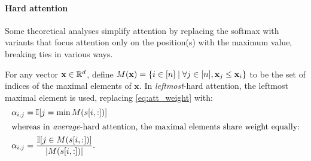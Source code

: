 \iffalse
Our definition deviates from the original formulation \citep{vaswani-etal-2017 attention} and commonly-used implementations in a few ways:
\begin{compactenum}
    \item Originally, $\qproj$ and $\kproj$ had $d_\text{k}$ output dimensions and $\vproj$ had $d_\text{v}$ output dimensions, and $d_\text{k}=d_\text{v}$. Here, we set all three to $\dhid$, aligning with common practice in implementations.
    \item Originally, $\outmap$ was defined as part of multi-head attention, but we have moved it into attention.
    This does not change the model.
    \item \Cref{eq:att_weight} is equivalent to the more usual matrix form $\softmax\mleft(\frac{\mat{Q}\mat{K}^\top}{\sqrt{\dhid}}\mright)\mat{V}$, where $\mat{Q} \in \R^{n\times\dhid}$ is a matrix whose $i$-th row corresponds to $\qproj(\mathbf{X})$, and similarly for $\mat{K}$ and $\mat{V}$.
    \item Some implementations use affine instead of linear transformations for $\qproj$, $\kproj$, and $\vproj$, and some include a bias term in $s_{i,j}(\mathbf{X})$.
\end{compactenum}
Since our focus here is solely on scaled dot-product attention, we will refer to it simply as \emph{attention}.
\fi

\iffalse
\insentpara{Multi-head attention} with $\dhid$ key/value dimensions per head is the sum of $\numheads$ attentions with $\dhid$ key/value dimensions: %
\begin{equation*}
\mha(\mathbf{x},\mathbf{X})= \sum_{h\in[\numheads]}\att_h(\mathbf{x},\mathbf{X}).
\end{equation*} 
Multi-head self attention is defined analogously.
This is equivalent to the original formulation, which concatenated the outputs of the heads and passed the result through a shared, larger, $\outmap$.
\fi

\paragraph{Hard attention}
Some theoretical analyses simplify attention by replacing the softmax with variants that focus attention only on the position(s) with the maximum value, breaking ties in various ways.

For any vector $\mathbf{x} \in \mathbb{R}^d$, define $M(\mathbf{x}) = \{i \in [n] \mid \forall j \in [n], \mathbf{x}_{j} \le \mathbf{x}_{i}\}$ to be the set of indices of the maximal elements of $\mathbf{x}$.
In \emph{leftmost}-hard attention, the leftmost maximal element is used, replacing \cref{eq:att_weight} with:
\begin{align}
    \alpha_{i,j} &= \mathbb{I}[j = \min M(s[i,:])] \\
\intertext{whereas in \emph{average}-hard attention, the maximal elements share weight equally:}
    \alpha_{i,j} &= \frac{\mathbb{I}[j \in M(s[i,:])]}{|M(s[i,:])|}.
\end{align}


